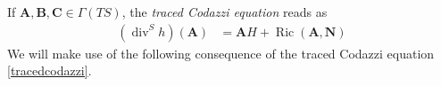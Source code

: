 \documentclass[11pt]{amsart}
\newcommand{\A}{\mathbf{A}}
\newcommand{\B}{\mathbf{B}}
\newcommand{\C}{\mathbf{C}}
\newcommand{\n}[1]{\nabla^\varepsilon_{ #1 }}
\renewcommand{\n}{\mathbf{N}}
\DeclareMathOperator{\ric}{Ric}
\DeclareMathOperator{\divv}{div}
\DeclareMathOperator{\trace}{trace}
\DeclareMathOperator{\R}{R}
\newtheorem{proposition}[theorem]{Proposition}
\theoremstyle{definition}
\theoremstyle{remark}
\numberwithin{equation}{section}
\begin{document}
 If $\A,\B,\C\in\Gamma(TS)$,
 the \emph{traced Codazzi equation} reads as  
     \begin{align}
            \left(\divv^S h\right)(\A)&=\A H+\ric(\A,\n)\label{tracedcodazzi}
        \end{align}
        We will make use of the following consequence of the traced Codazzi equation \eqref{tracedcodazzi}.
\end{document}

